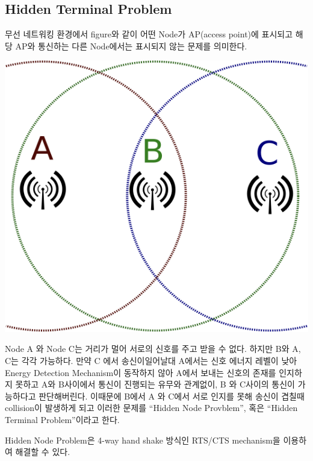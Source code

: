 \clearpage
\begin{multicols}{2}
%
%
\section{Hidden Terminal Problem}
\vspace{-2mm}
무선 네트워킹 환경에서 figure와 같이 어떤 Node가 AP(access point)에 표시되고 해당 AP와 통신하는 다른 Node에서는 표시되지 않는 문제를 의미한다.\\
    \begin{minipage}{\columnwidth}
    \vspace{2mm}
    \centering%
    \includegraphics[width=.5\textwidth]{image/week12/3-1.png}
    \vspace{-2mm}
    \end{minipage}

Node A 와 Node C는 거리가 멀어 서로의 신호를 주고 받을 수 없다. 하지만 B와 A, C는 각각 가능하다. 만약  C 에서 송신이일어날대 A에서는 신호 에너지 레벨이 낮아 Energy Detection Mechanism이 동작하지 않아 A에서 보내는 신호의 존재를 인지하지 못하고 A와 B사이에서 통신이 진행되는 유무와 관계없이, B 와 C사이의 통신이 가능하다고 판단해버린다. 이때문에  B에서 A 와 C에서 서로 인지를 못해 송신이 겹칠때 collision이 발생하게 되고 이러한 문제를 “Hidden Node Provblem”, 혹은 “Hidden Terminal Problem”이라고 한다. 

Hidden Node Problem은 4-way hand shake 방식인 RTS/CTS mechanism을 이용하여 해결할 수 있다.
\columnbreak
%
%

\end{multicols}
